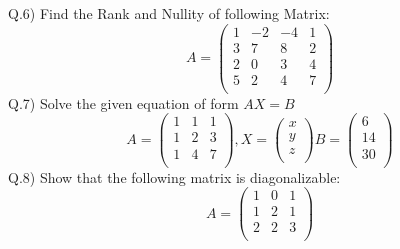 \documentclass[12pt]{article}
\begin{document}
	
	\begin{flushleft}
		Q.6) Find the Rank and Nullity of following Matrix:
		\[
		A=
		\begin{pmatrix}
			1 & -2 & -4 & 1 \\
			3 & 7  & 8  & 2 \\
			2 & 0  & 3  & 4 \\
			5 & 2  & 4  & 7 \\
		\end{pmatrix}
		\]
		Q.7) Solve the given equation of form $AX=B$
		\[
		A=
		\begin{pmatrix}
			1 & 1 & 1 \\
			1 & 2 & 3 \\
			1 & 4 & 7 \\
		\end{pmatrix}
		,
		X=
		\begin{pmatrix}
			x \\
			y \\
			z \\
		\end{pmatrix}
		B=
		\begin{pmatrix}
			6  \\
			14 \\
			30 \\
		\end{pmatrix}
		\]
		Q.8) Show that the following matrix is diagonalizable:
		\[
		A=
		\begin{pmatrix}
			1 & 0 & 1 \\
			1 & 2 & 1 \\
			2 & 2 & 3 \\
		\end{pmatrix}
		\]
	\end{flushleft}
	
	
\end{document}
